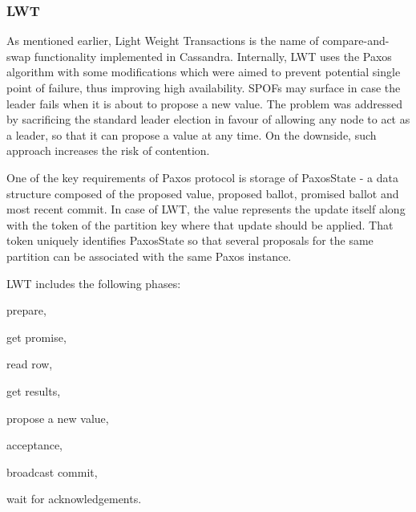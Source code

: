 %

\subsubsection{LWT}\label{sec:theory:transactions:lwt}
As mentioned earlier, Light Weight Transactions is the name of compare-and-swap functionality implemented in Cassandra. Internally, LWT uses the Paxos algorithm with some modifications which were aimed to prevent potential single point of failure, thus improving high availability. SPOFs may surface in case the leader fails when it is about to propose a new value. The problem was addressed by sacrificing the standard leader election in favour of allowing any node to act as a leader, so that it can propose a value at any time. On the downside, such approach increases the risk of contention. 

One of the key requirements of Paxos protocol is storage of PaxosState - a data structure composed of the proposed value, proposed ballot, promised ballot and most recent commit. In case of LWT, the value represents the update itself along with the token of the partition key where that update should be applied. That token uniquely identifies PaxosState so that several proposals for the same partition can be associated with the same Paxos instance. 


LWT includes the following phases: \begin{enumerate*}
\item prepare,
\item get promise,
\item read row,
\item get results,
\item propose a new value,
\item acceptance,
\item broadcast commit,
\item wait for acknowledgements.
\end{enumerate*} 


